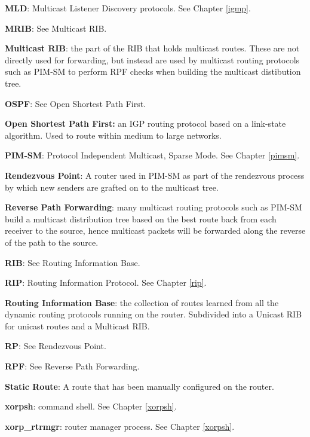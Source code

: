 \begin{description}
  \item{\bf MLD}: Multicast Listener Discovery protocols.  See Chapter
  \ref{igmp}.

  \item{\bf MRIB}: See Multicast RIB.

  \item{\bf Multicast RIB}: the part of the RIB that holds multicast routes.
  These are not directly used for forwarding, but instead are used by
  multicast routing protocols such as PIM-SM to perform RPF checks
  when building the multicast distibution tree.

  \item{\bf OSPF}: See Open Shortest Path First.

  \item{\bf Open Shortest Path First:} an IGP routing protocol based on
  a link-state algorithm.  Used to route within medium to large networks.

  \item{\bf PIM-SM}: Protocol Independent Multicast, Sparse Mode. See
  Chapter \ref{pimsm}.

  \item{\bf Rendezvous Point}: A router used in PIM-SM as part of the
  rendezvous process by which new senders are grafted on to the
  multicast tree.

  \item{\bf Reverse Path Forwarding}: many multicast routing protocols
  such as PIM-SM build a multicast distribution tree based on the best
  route back from each receiver to the source, hence multicast packets
  will be forwarded along the reverse of the path to the source.

  \item{\bf RIB}: See Routing Information Base.

  \item{\bf RIP}: Routing Information Protocol.  See Chapter \ref{rip}.

  \item{\bf Routing Information Base}: the collection of routes learned
  from all the dynamic routing protocols running on the router.
  Subdivided into a Unicast RIB for unicast routes and a Multicast RIB.

  \item{\bf RP}: See Rendezvous Point.

  \item{\bf RPF}: See Reverse Path Forwarding.

  \item{\bf Static Route}: A route that has been manually configured on
  the router.

  \item{\bf xorpsh}: \xorp command shell.  See Chapter \ref{xorpsh}.

  \item{\bf xorp\_rtrmgr}: \xorp router manager process.  See Chapter
  \ref{xorpsh}.

\end{description}

